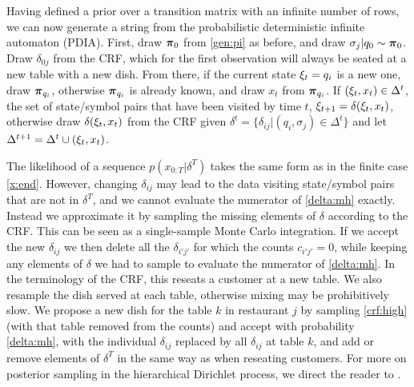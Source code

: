 {Having defined a prior over a transition matrix with an infinite number of rows, we can now generate a string from the probabilistic deterministic infinite automaton (PDIA).  First, draw $\bpi_0$ from \eqref{gen:pi} as before, and draw $\sigma_j|q_0 \sim \bpi_0$.  Draw $\delta_{0j}$ from the CRF, which for the first observation will always be seated at a new table with a new dish.  From there, if the current state $\q_t = q_i$ is a new one, draw $\bpi_{q_i}$, otherwise $\bpi_{q_i}$ is already known, and draw $x_t$ from $\bpi_{q_i}$.  If $(\q_t,x_t) \in \Delta^t$, the set of state/symbol pairs that have been visited by time $t$, $\q_{t+1} = \delta(\q_t,x_t)$, otherwise draw $\delta(\q_t,x_t)$ from the CRF given $\delta^t = \{\delta_{ij}|(q_i,\sigma_j)\in\Delta^t\}$ and let $\Delta^{t+1} = \Delta^t \cup (\q_t,x_t)$.



The likelihood of a sequence $p(x_{0:T}|\delta^T)$ takes the same form as in the finite case \eqref{x:end}.  However, changing $\delta_{ij}$ may lead to the data visiting state/symbol pairs that are not in $\delta^T$, and we cannot evaluate the numerator of \eqref{delta:mh} exactly.  Instead we approximate it by sampling the missing elements of $\delta$ according to the CRF.  This can be seen as a single-sample Monte Carlo integration.  If we accept the new $\delta_{ij}$ we then delete all the $\delta_{i'j'}$ for which the counts $c_{i'j'} = 0$, while keeping any elements of $\delta$ we had to sample to evaluate the numerator of \eqref{delta:mh}.  In the terminology of the CRF, this reseats a customer at a new table.  We also resample the dish served at each table, otherwise mixing may be prohibitively slow.  We propose a new dish for the table $k$ in restaurant $j$ by sampling \eqref{crf:high} (with that table removed from the counts) and accept with probability \eqref{delta:mh}, with the individual $\delta_{ij}$ replaced by all $\delta_{ij}$ at table $k$, and add or remove elements of $\delta^T$ in the same way as when reseating customers.  For more on posterior sampling in the hierarchical Dirichlet process, we direct the reader to \cite{Teh2006b}.
  }

 
